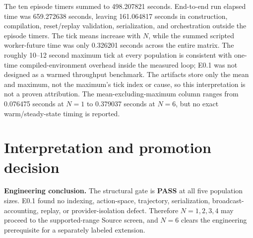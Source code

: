 \documentclass[11pt]{article}
\newcommand{\pass}{\textcolor{passgreen}{\textbf{PASS}}}
\begin{document}
\begin{table}[ht]
\centering
\scriptsize
{}
\caption{Population timing from the raw episode artifacts.  Means are weighted
by executed ticks; the exclusion statistic removes one maximum from each seed.}
\label{tab:timing}
\end{table}

The ten episode timers summed to 498.207821 seconds.  End-to-end run elapsed
time was 659.272638 seconds, leaving 161.064817 seconds in construction,
compilation, reset/replay validation, serialization, and orchestration outside
the episode timers.  The tick means increase with $N$, while the summed
scripted worker-future time was only 0.326201 seconds across the entire matrix.
The roughly 10--12 second maximum tick at every population is consistent with
one-time compiled-environment overhead inside the measured loop; E0.1 was not
designed as a warmed throughput benchmark.  The artifacts store only the mean
and maximum, not the maximum's tick index or cause, so this interpretation is
not a proven attribution.  The mean-excluding-maximum column ranges from
0.076475 seconds at $N=1$ to 0.379037 seconds at $N=6$, but no exact
warm/steady-state timing is reported.

\section{Interpretation and promotion decision}

\textbf{Engineering conclusion.}  The structural gate is \pass{} at all five
population sizes.  E0.1 found no indexing, action-space, trajectory,
serialization, broadcast-accounting, replay, or provider-isolation defect.
Therefore $N=1,2,3,4$ may proceed to the supported-range Source screen, and
$N=6$ clears the engineering prerequisite for a separately labeled extension.
\end{document}
